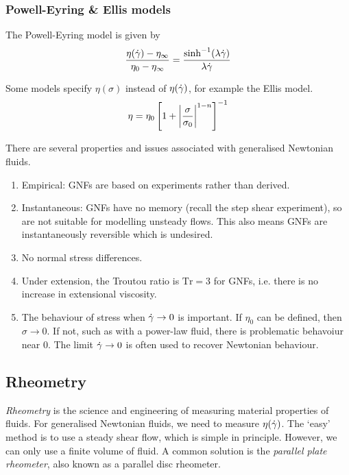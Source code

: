 \documentclass{jknotes}
\begin{document}
\subsubsection{Powell-Eyring \& Ellis models}
The Powell-Eyring model is given by
\begin{equation}
	\frac{\eta(\dot{\gamma})-\eta_\infty}{\eta_0 - \eta_\infty} =
	\frac{\sinh^{-1}(\lambda \dot{\gamma})}{\lambda \dot{\gamma}}
\end{equation}

Some models specify $\eta(\sigma)$ instead of $\eta(\dot{\gamma})$, for example the
Ellis model.
\begin{equation}
	\eta = \eta_0 \left[ 1 + \abs{\frac{\sigma}{\sigma_0}}^{1-n}\right]^{-1}
\end{equation}

There are several properties and issues associated with generalised Newtonian
fluids.
\begin{enumerate}
	\item Empirical: GNFs are based on experiments rather than derived.
	\item Instantaneous: GNFs have no memory (recall the step shear
		experiment), so are not suitable for modelling unsteady flows. This
		also means GNFs are instantaneously reversible which is undesired.
	\item No normal stress differences.
	\item Under extension, the Troutou ratio is $\text{Tr} = 3$ for GNFs, i.e.
		there is no increase in extensional viscosity.

	\item The behaviour of stress when $\dot{\gamma} \to 0$ is important. If
		$\eta_0$ can be defined, then $\sigma \to 0$. If not, such as with a
		power-law fluid, there is problematic behavoiur near $0$. The limit
		$\dot{\gamma} \to 0$ is often used to recover Newtonian behaviour.
\end{enumerate}

\subsection{Rheometry}
\emph{Rheometry} is the science and engineering of measuring material
properties of fluids. For generalised Newtonian fluids, we need to measure
$\eta(\dot{\gamma})$. The `easy' method is to use a steady shear flow, which is
simple in principle. However, we can only use a finite volume of fluid. A
common solution is the \emph{parallel plate rheometer}, also known as a
parallel disc rheometer. 
\end{document}
